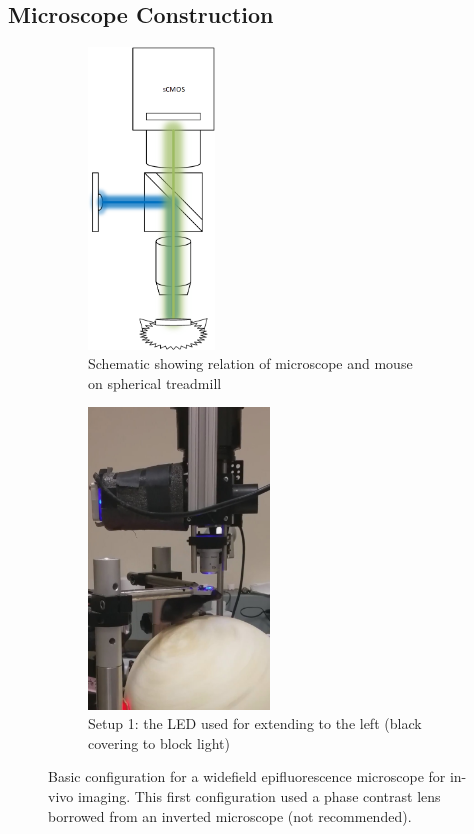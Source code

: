 \subsection{Microscope Construction}\label{sec:microscope-construction}

\begin{figure}[htb]
	\begin{subfigure}[t]{0.49\linewidth}\centering
        \includegraphics[height=8cm]{figures/widefield_microscope_diagram.png} \medskip
        \caption{Schematic showing relation of microscope and mouse on spherical treadmill}
	\end{subfigure}
	\hfill
	\begin{subfigure}[t]{0.49\linewidth}\centering
        \includegraphics[height=8cm]{figures/setup1.jpg} \medskip
        \caption{Setup 1: the LED used for extending to the left (black covering to block light)}
	\end{subfigure}
	\caption{Basic configuration for a widefield epifluorescence microscope for in-vivo imaging.
		This first configuration used a phase contrast lens borrowed from an inverted microscope (not recommended).
		}
	\label{fig:microscope-1}
\end{figure}

